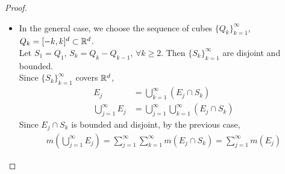 \begin{thm}
\begin{proof}
\begin{itemize}
				\newpage
				
				\item In the general case, we choose the sequence of cubes $\{ Q_k \}_{k = 1}^{\infty}$, $Q_k = [-k , k]^d \subset \mathbb{R}^d$.\\
				Let $S_1 = Q_1$, $S_k = Q_k - Q_{k - 1}$, $\forall k \geq 2$. Then $\{ S_k \}_{k = 1}^{\infty}$ are disjoint and  bounded.\\
				Since $\{ S_k \}_{k = 1}^{\infty}$ covers $\mathbb{R}^d$,
				\begin{align}
					E_j &= \bigcup_{k = 1}^{\infty}{(E_j \cap S_k)} \\
					\bigcup_{j = 1}^{\infty}{E_j} &= \bigcup_{j = 1}^{\infty}\bigcup_{k = 1}^{\infty}{(E_j \cap S_k)}
				\end{align}
				Since $E_j \cap S_k$ is bounded and disjoint, by the previous case,
				\begin{align}
					m(\bigcup_{j = 1}^{\infty}{E_j}) = \sum_{j = 1}^{\infty}\sum_{k = 1}^{\infty}{m(E_j \cap S_k)} = \sum_{j = 1}^{\infty}{m(E_j)}
				\end{align}
			\end{itemize}
		\end{proof}
	\end{thm}
	
	\vspace{2em}
